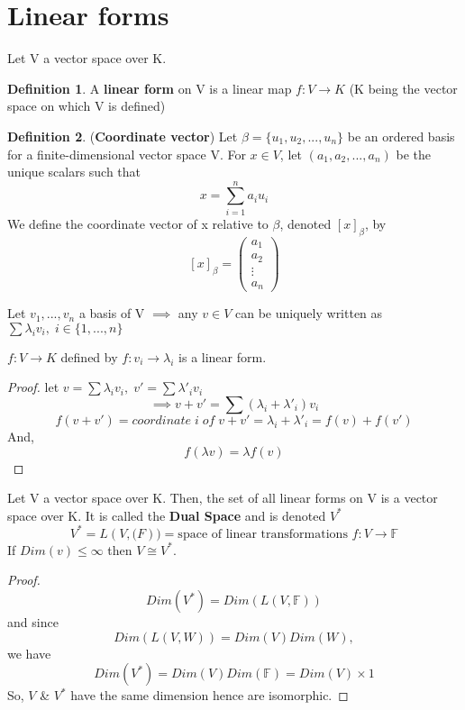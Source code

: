 \documentclass[12pt]{article}
\theoremstyle{definition}
\newtheorem{definition}{Definition}[section]
\theoremstyle{remark}
\begin{document}
\section{Linear forms}
        Let V a vector space over K. 
        \begin{definition}
            A \textbf{linear form} on V is a linear map $f: V\rightarrow K$ (K being the vector space on which V is defined)
        \end{definition}
        \begin{definition}(\textbf{Coordinate vector})
            Let $\beta = \{u_1,u_2,... ,u_n\}$ be an ordered basis for a finite-dimensional vector space V. For $x \in V$, 
            let $(a_1, a_2 ,..., a_n)$ be the unique scalars such that
            $$x = \sum^n_{i=1}a_i u_i $$
            We define the coordinate vector of x relative to $\beta$, denoted $[x]_\beta$, by
            $$[x]_\beta = \begin{pmatrix}
                a_1 \\a_2 \\\vdots \\ a_n 
            \end{pmatrix}$$


        \end{definition}
        \begin{example}
            Let $v_1,..., v_n$ a basis of V $\implies$ any $v \in V$  can be uniquely written as $\sum \lambda_i v_i,\; i \in \{1,...,n\}$
            \begin{proposition}
                $f: V\rightarrow K$ defined by $f:v_i \rightarrow \lambda_i$ is a linear form. 
                \begin{proof}
                    let $v= \sum \lambda_i v_i , \; v'=\sum \lambda'_i v_i$
                        $$\implies v+v' = \sum (\lambda_i+ \lambda'_i)v_i$$
                        $$f(v+v')= coordinate \; i \; of \; v+v' = \lambda_i + \lambda'_i =f(v) + f(v')$$
                        And,
                        $$f(\lambda v)=\lambda f(v)$$

                \end{proof}
            \end{proposition}
        \end{example}
        \begin{proposition}
            Let V a vector space over K. Then, the set of all linear forms on V is a vector space over K. It is called the 
            \textbf{Dual Space} and is denoted $V^*$
            $$V^* = L(V, \mathbb(F)) = \text{space of linear transformations }f: V\rightarrow \mathbb{F}$$
            If $Dim(v) \leq \infty$ then $V\cong V^*$. 
            \begin{proof}
                $$Dim(V^*) = Dim(L(V, \mathbb{F}))$$
            and since 
            $$Dim (L(V,W)) = Dim(V) Dim(W),$$
            we have 
            $$Dim(V^*) = Dim(V) Dim(\mathbb{F}) = Dim(V)\times 1$$
            So, $V$ \& $V^*$ have the same dimension hence are isomorphic.
            \end{proof} 
        \end{proposition}
\end{document}
